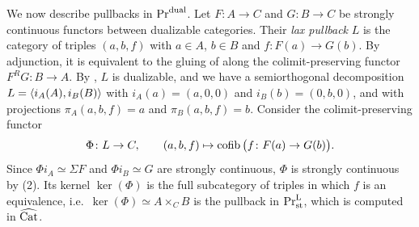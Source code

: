 	We now describe pullbacks in $\textup{Pr}^{\operatorname{dual}}$. Let $F\colon A \to C$ and $G\colon B \to C$ be strongly continuous functors between dualizable categories. Their \emph{lax pullback} $L$ is the category of triples $(a,b,f)$ with $a \in A$, $b \in B$ and $f\colon F(a) \to G(b)$. By adjunction, it is equivalent to the gluing of  along the colimit-preserving functor $F^RG\colon B \to A$. By , $L$ is dualizable, and we have a semiorthogonal decomposition $L = \langle i_A(A),i_B(B) \rangle$ with $i_A(a) = (a,0,0)$ and $i_B(b) = (0,b,0)$, and with projections $\pi_A(a,b,f) = a$ and $\pi_B(a,b,f) = b$. Consider the colimit-preserving functor
	\[
		\Phi\colon L \to C, \qquad (a,b,f) \mapsto \operatorname{cofib}\big(f\colon F(a) \to G(b)\big).
	\]
	Since $\Phi i_A \simeq \Sigma F$ and $\Phi i_B \simeq G$ are strongly continuous, $\Phi$ is strongly continuous by (2). Its kernel $\ker(\Phi)$ is the full subcategory of triples in which $f$ is an equivalence, i.e.\ $\ker(\Phi) \simeq A \times_C B$ is the pullback in $\textup{Pr}^{\textup{L}}_{\operatorname{st}}$, which is computed in $\widehat{{\textup{Cat}}}$.

